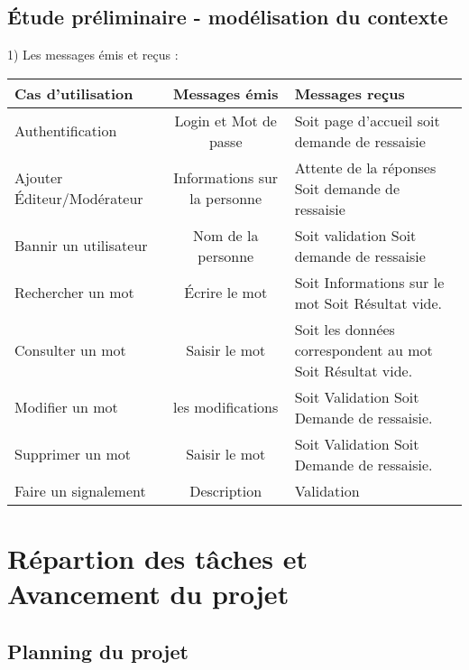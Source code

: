 \documentclass[12pt,a4paper]{article}
\begin{document}
\subsection{Étude préliminaire - modélisation du contexte}

1) Les messages émis et reçus : \\

\begin{tabularx}{\textwidth}{|l|c|X|}
  \hline
  \textbf{Cas d'utilisation} & 
  \textbf{Messages émis} & 
  \textbf{Messages reçus} \\
  \hline
  Authentification & 
  Login et Mot de passe & Soit page d'accueil soit demande de ressaisie
  \\ 
   \hline
  \hline
 Ajouter Éditeur/Modérateur & Informations sur la personne & Attente de la réponses Soit demande de ressaisie
    \\
  \hline
  \hline
 Bannir un utilisateur & Nom de la personne  &  Soit validation Soit demande de ressaisie
    \\
  \hline
    \hline
 Rechercher un mot & Écrire le mot &  Soit Informations sur le mot Soit Résultat vide.
    \\
  \hline
   \hline
 Consulter un mot & Saisir le mot &  Soit les données correspondent au mot Soit Résultat vide.
    \\
  \hline
   \hline
 Modifier un mot & les modifications &  Soit Validation  Soit Demande de ressaisie.
    \\
  \hline
    \hline
 Supprimer un mot & Saisir le mot &  Soit Validation  Soit Demande de ressaisie.
    \\
  \hline
      \hline
 Faire un signalement & Description &  Validation
    \\
  \hline
\end{tabularx}
\section{Répartion des tâches et Avancement du projet}

\subsection{Planning du projet}
\end{document}
